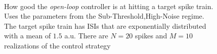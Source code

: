\documentclass[12pt]{iopart}
\begin{document}
\begin{figure}[htp]
\begin{center}    \\
  \caption[ ]{How good the {\sl open-loop} controller is at hitting a target
  spike train. Uses the parameters from the Sub-Threshold,High-Noise regime. The
  target spike train has ISIs that are exponentially distributed with a
  mean of $1.5$ a.u. There are $N=20$ spikes and $M=10$ realizations of the
  control strategy}
  \label{fig:targettrain_ol_highnoise}
\end{center}
\end{figure}
\end{document}
